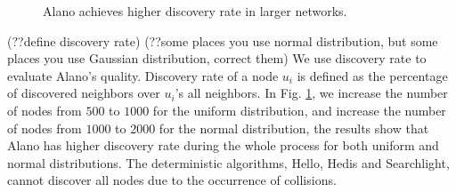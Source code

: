 \begin{figure}[!h]

\hspace{0.01in}
\hspace{0.01in}
\hspace{0.01in}
\caption{Alano achieves higher discovery rate in larger networks.}
\label{fig_timerate_large}
\end{figure}


(??define discovery rate)
(??some places you use normal distribution, but some places you use Gaussian distribution, correct them)
We use discovery rate to evaluate Alano's quality.
Discovery rate of a node $u_i$ is defined as the percentage of discovered neighbors over $u_i$'s all neighbors.
In Fig. \ref{fig_timerate_large}, we increase the number of nodes from $500$ to $1000$ for the uniform distribution, and increase the number of nodes from $1000$ to $2000$ for the normal distribution, the results show that Alano has higher discovery rate during the whole process for both uniform and normal distributions. The deterministic algorithms, Hello, Hedis and Searchlight, cannot discover all nodes due to the occurrence of collisions.





